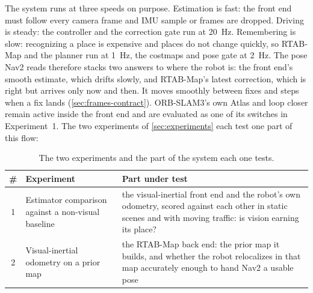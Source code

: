 The system runs at three speeds on purpose. Estimation is fast: the front end
must follow every camera frame and IMU sample or frames are dropped. Driving is
steady: the controller and the correction gate run at \SI{20}{\hertz}.
Remembering is slow: recognizing a place is expensive and places do not change
quickly, so RTAB-Map and the planner run at \SI{1}{\hertz}, the costmaps and
pose gate at \SI{2}{\hertz}. The pose Nav2 reads therefore stacks two answers to
where the robot is: the front end's smooth estimate, which drifts slowly, and
RTAB-Map's latest correction, which is right but arrives only now and then. It
moves smoothly between fixes and steps when a fix lands
(\cref{sec:frames-contract}). ORB-SLAM3's own Atlas and loop closer remain
active inside the front end and are evaluated as one of its switches in
Experiment~1. The two experiments of \cref{sec:experiments} each test one part
of this flow:

\begin{table}[htbp]
\centering
\caption{The two experiments and the part of the system each one tests.}
\label{tab:experiment-map}
\small
\begin{tabularx}{\textwidth}{c>{\raggedright\arraybackslash}p{}>{\raggedright\arraybackslash}X}
\toprule
\# & Experiment & Part under test \\
\midrule
1 & Estimator comparison against a non-visual baseline & the visual-inertial
  front end and the robot's own odometry, scored against each other in static
  scenes and with moving traffic: is vision earning its place? \\
2 & Visual-inertial odometry on a prior map & the RTAB-Map back end: the prior
  map it builds, and whether the robot relocalizes in that map accurately
  enough to hand Nav2 a usable pose \\
\bottomrule
\end{tabularx}
\end{table}

